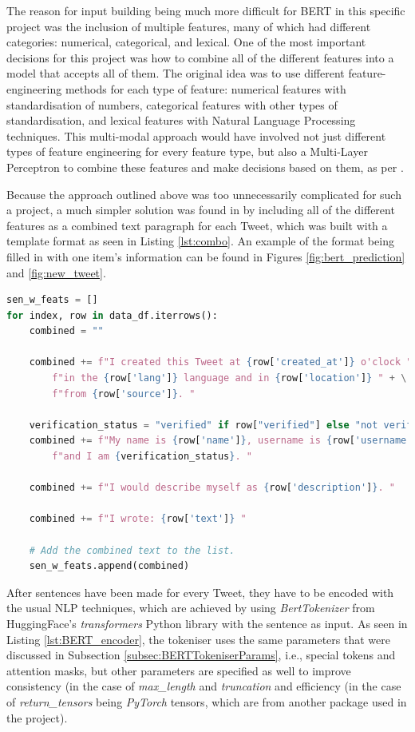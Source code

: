 \documentclass{l4proj}
\begin{document}
The reason for input building being much more difficult for BERT in this specific project was the inclusion of multiple features, many of which had different categories: numerical, categorical, and lexical. One of the most important decisions for this project was how to combine all of the different features into a model that accepts all of them. The original idea was to use different feature-engineering methods for each type of feature: numerical features with standardisation of numbers, categorical features with other types of standardisation, and lexical features with Natural Language Processing techniques. This multi-modal approach would have involved not just different types of feature engineering for every feature type, but also a Multi-Layer Perceptron to combine these features and make decisions based on them, as per \citet{MultiModalBert}.

Because the approach outlined above was too unnecessarily complicated for such a project, a much simpler solution was found in \citet{BERTAllFeatures} by including all of the different features as a combined text paragraph for each Tweet, which was built with a template format as seen in Listing \ref{lst:combo}. An example of the format being filled in with one item's information can be found in Figures \ref{fig:bert_prediction} and \ref{fig:new_tweet}.

\begin{lstlisting}[language=python, float, caption={Combining all features into one paragraph per Tweet that BERT can then analyse.}, label=lst:combo]
sen_w_feats = []
for index, row in data_df.iterrows():
    combined = ""
    
    combined += f"I created this Tweet at {row['created_at']} o'clock " + \
        f"in the {row['lang']} language and in {row['location']} " + \
        f"from {row['source']}. "
        
    verification_status = "verified" if row["verified"] else "not verified"
    combined += f"My name is {row['name']}, username is {row['username']} " + \
        f"and I am {verification_status}. "
    
    combined += f"I would describe myself as {row['description']}. "
    
    combined += f"I wrote: {row['text']} "
    
    # Add the combined text to the list.
    sen_w_feats.append(combined)

\end{lstlisting}

After sentences have been made for every Tweet, they have to be encoded with the usual NLP techniques, which are achieved by using \textit{BertTokenizer} from HuggingFace's \textit{transformers} Python library with the sentence as input. As seen in Listing \ref{lst:BERT_encoder}, the tokeniser uses the same parameters that were discussed in Subsection \ref{subsec:BERTTokeniserParams}, i.e., special tokens and attention masks, but other parameters are specified as well to improve consistency (in the case of \textit{max\_length} and \textit{truncation} and efficiency (in the case of \textit{return\_tensors} being \textit{PyTorch} tensors, which are from another package used in the project).
\end{document}
